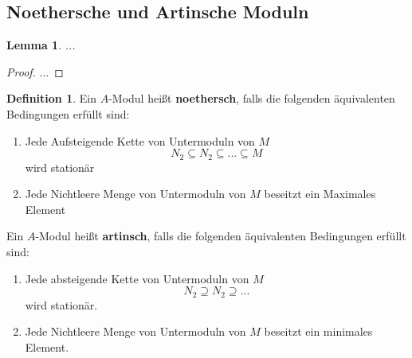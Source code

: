 \documentclass[10pt,a4paper]{article}
\newcounter{thm}[section]
\theoremstyle{definition}
\newtheorem{definition}[thm]{Definition}
\theoremstyle{plain}
\newtheorem{lem}[thm]{Lemma}
\theoremstyle{remark}
\begin{document}
\subsection{Noethersche und Artinsche Moduln}
\begin{lem}
	...%
\end{lem}
\begin{proof}
	... %
\end{proof}
\begin{definition}
	Ein $A$-Modul heißt \textbf{noethersch}, falls die folgenden äquivalenten Bedingungen erfüllt sind:
	\begin{enumerate}
		\item Jede Aufsteigende Kette von Untermoduln von $M$
		\[N_2\subseteq N_2\subseteq...\subseteq M\]
		wird stationär
		\item Jede Nichtleere Menge von Untermoduln von $M$ beseitzt ein Maximales Element
	\end{enumerate}
	Ein $A$-Modul heißt \textbf{artinsch}, falls die folgenden äquivalenten Bedingungen erfüllt sind:
	\begin{enumerate}
		\item Jede absteigende Kette von Untermoduln von $M$
		\[N_2\supseteq N_2\supseteq...\]
		wird stationär.
		\item Jede Nichtleere Menge von Untermoduln von $M$ beseitzt ein minimales Element.
	\end{enumerate}
\end{definition}

\addtocounter{thm}{-1}
\end{document}
